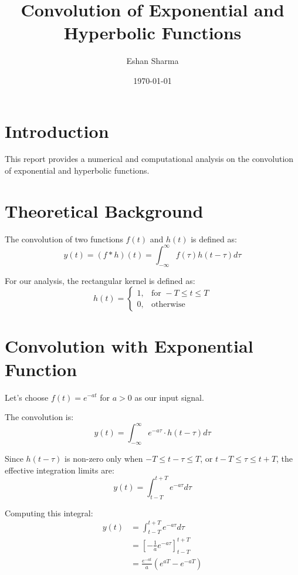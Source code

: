 \documentclass{article}
\title{Convolution of Exponential and Hyperbolic Functions}
\author{Eshan Sharma}
\date{\today}
\begin{document}
	
	\maketitle
	
	\section{Introduction}
	This report provides a numerical and computational analysis on the convolution of exponential and hyperbolic functions.
	
	\section{Theoretical Background}
	The convolution of two functions $f(t)$ and $h(t)$ is defined as:
	\begin{equation}
		y(t) = (f * h)(t) = \int_{-\infty}^{\infty} f(\tau) h(t - \tau) d\tau
	\end{equation}
	
	For our analysis, the rectangular kernel is defined as:
	\begin{equation}
		h(t) = 
		\begin{cases} 
			1, & \text{for } -T \leq t \leq T \\
			0, & \text{otherwise}
		\end{cases}
	\end{equation}
	
	\section{Convolution with Exponential Function}
	Let's choose $f(t) = e^{-at}$ for $a > 0$ as our input signal.
	
	The convolution is:
	\begin{equation}
		y(t) = \int_{-\infty}^{\infty} e^{-a\tau} \cdot h(t - \tau) d\tau
	\end{equation}
	
	Since $h(t - \tau)$ is non-zero only when $-T \leq t - \tau \leq T$, or $t - T \leq \tau \leq t + T$, the effective integration limits are:
	\begin{equation}
		y(t) = \int_{t-T}^{t+T} e^{-a\tau} d\tau
	\end{equation}
	
	Computing this integral:
	\begin{align}
		y(t) &= \int_{t-T}^{t+T} e^{-a\tau} d\tau \\
		&= \left[ -\frac{1}{a}e^{-a\tau} \right]_{t-T}^{t+T} \\
		&= \frac{e^{-at}}{a}(e^{aT} - e^{-aT})
	\end{align}
	
\end{document}

